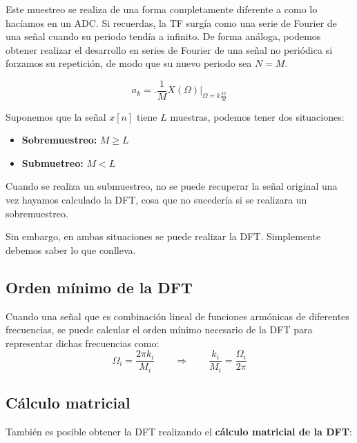 \documentclass[a4paper,oneside]{book}
\begin{document}
Este muestreo se realiza de una forma completamente diferente a como lo hacíamos en un ADC. Si recuerdas, la TF surgía como una serie de Fourier de una señal cuando su periodo tendía a infinito. De forma análoga, podemos obtener realizar el desarrollo en series de Fourier de una señal no periódica si forzamos su repetición, de modo que su nuevo periodo sea $N = M$.

\[ a_k = \biggl. \frac{1}{M} X(\Omega ) \biggr\vert _{\Omega = k \frac{2\pi}{M}}\]

Suponemos que la señal $x[n]$ tiene $L$ muestras, podemos tener dos situaciones:
\begin{multicols}{2}
	\begin{itemize}
		\item \textbf{Sobremuestreo:} $\boxed{M\geq L}$
		\item \textbf{Submuetreo:} $\boxed{M<L}$
	\end{itemize}
\end{multicols}

Cuando se realiza un submuestreo, no se puede recuperar la señal original una vez hayamos calculado la DFT, cosa que no sucedería si se realizara un sobremuestreo.

Sin embargo, en ambas situaciones se puede realizar la DFT. Simplemente debemos saber lo que conlleva.

\subsection{Orden mínimo de la DFT}

Cuando una señal que es combinación lineal de funciones armónicas de diferentes frecuencias, se puede calcular el orden mínimo necesario de la DFT para representar dichas frecuencias como:
\[ \Omega_i = \frac{2\pi k_i}{M_i} \qquad \Longrightarrow \qquad \boxed{\frac{k_i}{M_i} = \frac{\Omega _i}{2\pi}} \]

\subsection{Cálculo matricial}

También es posible obtener la DFT realizando el \textbf{cálculo matricial de la DFT}:
\end{document}
